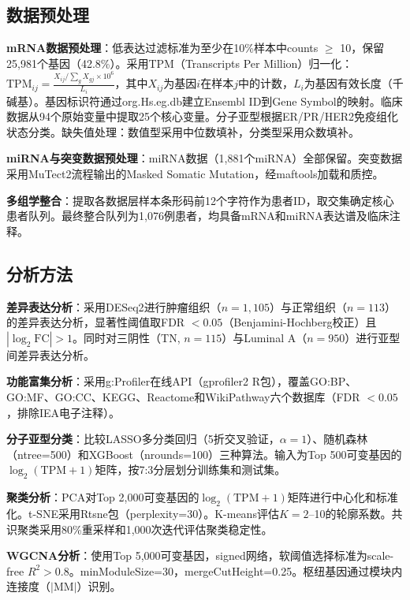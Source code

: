 \documentclass[12pt,a4paper]{ctexart}
\begin{document}
\subsection{数据预处理}

\textbf{mRNA数据预处理}：低表达过滤标准为至少在10\%样本中counts $\geq$ 10，保留25,981个基因（42.8\%）。采用TPM（Transcripts Per Million）归一化：$\text{TPM}_{ij} = \frac{X_{ij} / \sum_g X_{gj} \times 10^6}{L_i}$，其中$X_{ij}$为基因$i$在样本$j$中的计数，$L_i$为基因有效长度（千碱基）。基因标识符通过org.Hs.eg.db建立Ensembl ID到Gene Symbol的映射。临床数据从94个原始变量中提取25个核心变量。分子亚型根据ER/PR/HER2免疫组化状态分类。缺失值处理：数值型采用中位数填补，分类型采用众数填补。

\textbf{miRNA与突变数据预处理}：miRNA数据（1,881个miRNA）全部保留。突变数据采用MuTect2流程输出的Masked Somatic Mutation，经maftools\cite{mayakonda2018maftools}加载和质控。

\textbf{多组学整合}：提取各数据层样本条形码前12个字符作为患者ID，取交集确定核心患者队列。最终整合队列为1,076例患者，均具备mRNA和miRNA表达谱及临床注释。

\subsection{分析方法}

\textbf{差异表达分析}：采用DESeq2\cite{love2014moderated}进行肿瘤组织（$n=1,105$）与正常组织（$n=113$）的差异表达分析，显著性阈值取FDR $< 0.05$（Benjamini-Hochberg校正）且$|\log_2\text{FC}| > 1$。同时对三阴性（TN, $n=115$）与Luminal A（$n=950$）进行亚型间差异表达分析。

\textbf{功能富集分析}：采用g:Profiler在线API（gprofiler2 R包）\cite{kolberg2023gprofiler}，覆盖GO:BP、GO:MF、GO:CC、KEGG、Reactome和WikiPathway六个数据库（FDR $< 0.05$，排除IEA电子注释）。

\textbf{分子亚型分类}：比较LASSO多分类回归（5折交叉验证，$\alpha=1$）、随机森林（ntree=500）和XGBoost（nrounds=100）三种算法。输入为Top 500可变基因的$\log_2(\text{TPM}+1)$矩阵，按7:3分层划分训练集和测试集。

\textbf{聚类分析}：PCA对Top 2,000可变基因的$\log_2(\text{TPM}+1)$矩阵进行中心化和标准化。t-SNE采用Rtsne包（perplexity=30）。K-means评估$K=2$--10的轮廓系数。共识聚类\cite{wilkerson2010consensus}采用80\%重采样和1,000次迭代评估聚类稳定性。

\textbf{WGCNA分析}\cite{langfelder2008wgcna}：使用Top 5,000可变基因，signed网络，软阈值选择标准为scale-free $R^2 > 0.8$。minModuleSize=30，mergeCutHeight=0.25。枢纽基因通过模块内连接度（$|\text{MM}|$）识别。
\end{document}
